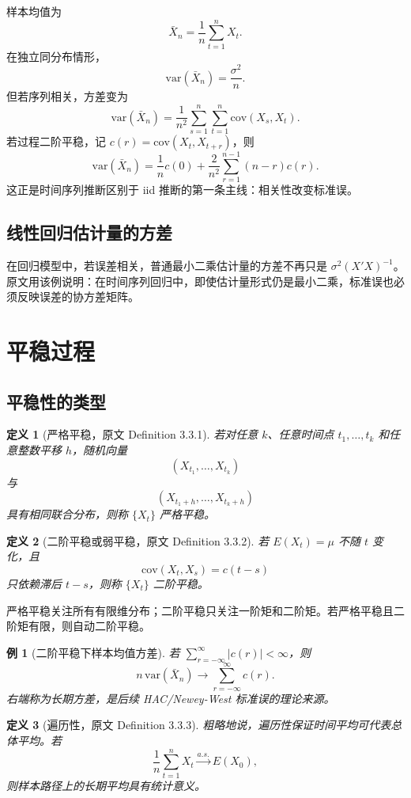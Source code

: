 \documentclass[11pt,a4paper,openany]{ctexbook}
\newtheorem{definition}{定义}[section]
\newtheorem{example}{例}[section]
\begin{document}
样本均值为
\[
  \bar X_n=\frac1n\sum_{t=1}^n X_t.
\]
在独立同分布情形，
\[
  \mathrm{var}(\bar X_n)=\frac{\sigma^2}{n}.
\]
但若序列相关，方差变为
\[
  \mathrm{var}(\bar X_n)
  =\frac1{n^2}\sum_{s=1}^n\sum_{t=1}^n\mathrm{cov}(X_s,X_t).
\]
若过程二阶平稳，记 \(c(r)=\mathrm{cov}(X_t,X_{t+r})\)，则
\[
  \mathrm{var}(\bar X_n)
  =\frac1n c(0)+\frac2{n^2}\sum_{r=1}^{n-1}(n-r)c(r).
\]
这正是时间序列推断区别于 iid 推断的第一条主线：相关性改变标准误。

\subsection{线性回归估计量的方差}

在回归模型中，若误差相关，普通最小二乘估计量的方差不再只是 \(\sigma^2(X'X)^{-1}\)。原文用该例说明：在时间序列回归中，即使估计量形式仍是最小二乘，标准误也必须反映误差的协方差矩阵。

\section{平稳过程}

\subsection{平稳性的类型}

\begin{definition}[严格平稳，原文 Definition 3.3.1]
若对任意 \(k\)、任意时间点 \(t_1,\ldots,t_k\) 和任意整数平移 \(h\)，随机向量
\[
  (X_{t_1},\ldots,X_{t_k})
\]
与
\[
  (X_{t_1+h},\ldots,X_{t_k+h})
\]
具有相同联合分布，则称 \(\{X_t\}\) 严格平稳。
\end{definition}

\begin{definition}[二阶平稳或弱平稳，原文 Definition 3.3.2]
若 \(E(X_t)=\mu\) 不随 \(t\) 变化，且
\[
  \mathrm{cov}(X_t,X_s)=c(t-s)
\]
只依赖滞后 \(t-s\)，则称 \(\{X_t\}\) 二阶平稳。
\end{definition}

严格平稳关注所有有限维分布；二阶平稳只关注一阶矩和二阶矩。若严格平稳且二阶矩有限，则自动二阶平稳。

\begin{example}[二阶平稳下样本均值方差]
若 \(\sum_{r=-\infty}^{\infty}|c(r)|<\infty\)，则
\[
  n\,\mathrm{var}(\bar X_n)
  \to \sum_{r=-\infty}^{\infty}c(r).
\]
右端称为长期方差，是后续 HAC/Newey-West 标准误的理论来源。
\end{example}

\begin{definition}[遍历性，原文 Definition 3.3.3]
粗略地说，遍历性保证时间平均可代表总体平均。若
\[
  \frac1n\sum_{t=1}^n X_t \xrightarrow{a.s.} E(X_0),
\]
则样本路径上的长期平均具有统计意义。
\end{definition}
\end{document}
